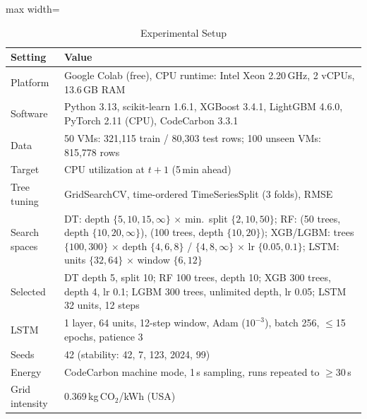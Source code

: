 \documentclass[conference,letterpaper,10pt]{IEEEtran}
\begin{document}
\begin{table}[!htb]
\centering
\caption{Experimental Setup}
\label{tab:setup}
\footnotesize
\begin{adjustbox}{max width=\columnwidth}
\begin{tabular}{lp{5.2cm}}
\toprule
Setting & Value \\
\midrule
Platform & Google Colab (free), CPU runtime: Intel Xeon 2.20\,GHz, 2 vCPUs, 13.6\,GB RAM \\
Software & Python 3.13, scikit-learn 1.6.1, XGBoost 3.4.1, LightGBM 4.6.0, PyTorch 2.11 (CPU), CodeCarbon 3.3.1 \\
Data & 50 VMs: 321{,}115 train / 80{,}303 test rows; 100 unseen VMs: 815{,}778 rows \\
Target & CPU utilization at $t+1$ (5\,min ahead) \\
Tree tuning & GridSearchCV, time-ordered TimeSeriesSplit (3 folds), RMSE \\
Search spaces & DT: depth $\{5,10,15,\infty\}$ $\times$ min.\ split $\{2,10,50\}$; RF: (50 trees, depth $\{10,20,\infty\}$), (100 trees, depth $\{10,20\}$); XGB/LGBM: trees $\{100,300\}$ $\times$ depth $\{4,6,8\}$ / $\{4,8,\infty\}$ $\times$ lr $\{0.05,0.1\}$; LSTM: units $\{32,64\}$ $\times$ window $\{6,12\}$ \\
Selected & DT depth 5, split 10; RF 100 trees, depth 10; XGB 300 trees, depth 4, lr 0.1; LGBM 300 trees, unlimited depth, lr 0.05; LSTM 32 units, 12 steps \\
LSTM & 1 layer, 64 units, 12-step window, Adam ($10^{-3}$), batch 256, $\leq$15 epochs, patience 3 \\
Seeds & 42 (stability: 42, 7, 123, 2024, 99) \\
Energy & CodeCarbon machine mode, 1\,s sampling, runs repeated to $\geq$30\,s \\
Grid intensity & 0.369\,kg\,CO$_2$/kWh (USA) \\
\bottomrule
\end{tabular}
\end{adjustbox}
\end{table}
\end{document}
